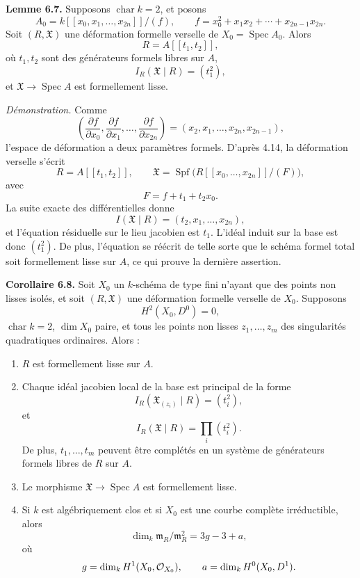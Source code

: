 \documentclass[11pt]{article}
\providecommand{\Spec}{\operatorname{Spec}}
\providecommand{\Spf}{\operatorname{Spf}}
\begin{document}
\textbf{Lemme 6.7.}  Supposons \(\operatorname{char}k=2\), et posons
\[
        A_0=
        k[[x_0,x_1,\ldots,x_{2n}]]/(f),
        \qquad
        f=x_0^2+x_1x_2+\cdots+x_{2n-1}x_{2n}.
\]
Soit \((R,\mathfrak X)\) une déformation formelle verselle de \(X_0=\Spec A_0\).  Alors
\[
        R=A[[t_1,t_2]],
\]
où \(t_1,t_2\) sont des générateurs formels libres sur \(A\),
\[
        I_R(\mathfrak X\mid R)=(t_1^2),
\]
et \(\mathfrak X\to\Spec A\) est formellement lisse.

\emph{Démonstration.}  Comme
\[
        \left(\frac{\partial f}{\partial x_0},
        \frac{\partial f}{\partial x_1},\ldots,
        \frac{\partial f}{\partial x_{2n}}\right)
        =
        (x_2,x_1,\ldots,x_{2n},x_{2n-1}),
\]
l'espace de déformation a deux paramètres formels.  D'après 4.14, la déformation verselle s'écrit
\[
        R=A[[t_1,t_2]],\qquad
        \mathfrak X=
        \Spf\bigl(R[[x_0,\ldots,x_{2n}]]/(F)\bigr),
\]
avec
\[
        F=f+t_1+t_2x_0.
\]
La suite exacte des différentielles donne
\[
        I(\mathfrak X\mid R)=(t_2,x_1,\ldots,x_{2n}),
\]
et l'équation résiduelle sur le lieu jacobien est \(t_1\).  L'idéal induit sur la base est donc \((t_1^2)\).  De plus, l'équation se réécrit de telle sorte que le schéma formel total soit formellement lisse sur \(A\), ce qui prouve la dernière assertion.

\textbf{Corollaire 6.8.}  Soit \(X_0\) un \(k\)-schéma de type fini n'ayant que des points non lisses isolés, et soit \((R,\mathfrak X)\) une déformation formelle verselle de \(X_0\).  Supposons
\[
        H^2(X_0,D^0)=0,
\]
\(\operatorname{char}k=2\), \(\dim X_0\) paire, et tous les points non lisses \(z_1,\ldots,z_m\) des singularités quadratiques ordinaires.  Alors :
\begin{enumerate}[label=(\arabic*)]
\item \(R\) est formellement lisse sur \(A\).
\item Chaque idéal jacobien local de la base est principal de la forme
\[
        I_R(\mathfrak X_{(z_i)}\mid R)=(t_i^2),
\]
et
\[
        I_R(\mathfrak X\mid R)=\prod_i (t_i^2).
\]
De plus, \(t_1,\ldots,t_m\) peuvent être complétés en un système de générateurs formels libres de \(R\) sur \(A\).
\item Le morphisme \(\mathfrak X\to\Spec A\) est formellement lisse.
\item Si \(k\) est algébriquement clos et si \(X_0\) est une courbe complète irréductible, alors
\[
        \dim_k\mathfrak m_R/\mathfrak m_R^2=3g-3+a,
\]
où
\[
        g=\dim_kH^1(X_0,\mathcal O_{X_0}),
        \qquad
        a=\dim_kH^0(X_0,D^1).
\]
\end{enumerate}
\end{document}
